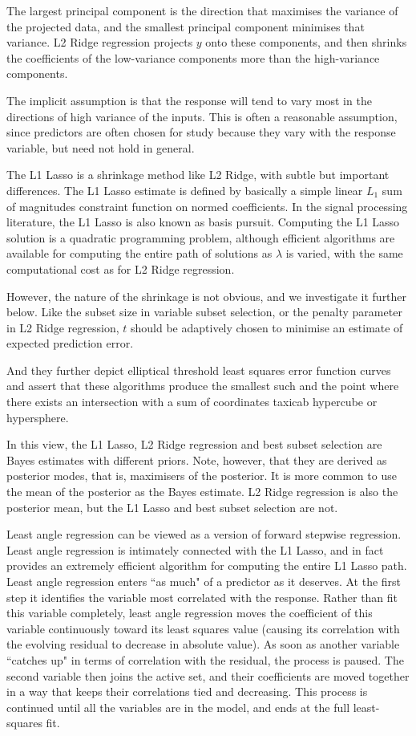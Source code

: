 The largest principal component is the direction that maximises the variance of the projected data, and the smallest principal component minimises that variance. L2 Ridge regression projects $y$ onto these components, and then shrinks the coefficients of the low-variance components more than the high-variance components.

The implicit assumption is that the response will tend to vary most in the directions of high variance of the inputs. This is often a reasonable assumption, since predictors are often chosen for study because they vary with the response variable, but need not hold in general.

The L1 Lasso is a shrinkage method like L2 Ridge, with subtle but important differences. The L1 Lasso estimate is defined by basically a simple linear $L_1$ sum of magnitudes constraint function on normed coefficients. In the signal processing literature, the L1 Lasso is also known as basis pursuit. Computing the L1 Lasso solution is a quadratic programming problem, although efficient algorithms are available for computing the entire path of solutions as $\lambda$ is varied, with the same computational cost as for L2 Ridge regression.

However, the nature of the shrinkage is not obvious, and we investigate it further below. Like the subset size in variable subset selection, or the penalty parameter in L2 Ridge regression, $t$ should be adaptively chosen to minimise an estimate of expected prediction error.

And they further depict elliptical threshold least squares error function curves and assert that these algorithms produce the smallest such and the point where there exists an intersection with a sum of coordinates taxicab hypercube or hypersphere.

In this view, the L1 Lasso, L2 Ridge regression and best subset selection are Bayes estimates with different priors. Note, however, that they are derived as posterior modes, that is, maximisers of the posterior. It is more common to use the mean of the posterior as the Bayes estimate. L2 Ridge regression is also the posterior mean, but the L1 Lasso and best subset selection are not.

Least angle regression can be viewed as a version of forward stepwise regression. Least angle regression is intimately connected with the L1 Lasso, and in fact provides an extremely efficient algorithm for computing the entire L1 Lasso path. Least angle regression enters ``as much" of a predictor as it deserves. At the first step it identifies the variable most correlated with the response. Rather than fit this variable completely, least angle regression moves the coefficient of this variable continuously toward its least squares value (causing its correlation with the evolving residual to decrease in absolute value). As soon as another variable ``catches up" in terms of correlation with the residual, the process is paused. The second variable then joins the active set, and their coefficients are moved together in a way that keeps their correlations tied and decreasing. This process is continued until all the variables are in the model, and ends at the full least-squares fit.

